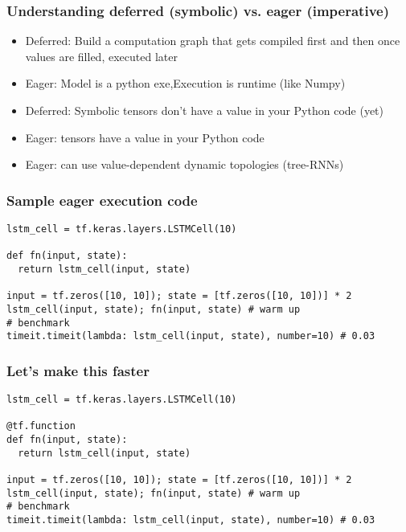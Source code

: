 
\begin{frame}[fragile] \frametitle{Understanding deferred (symbolic)
vs. eager (imperative)}

\begin{itemize}
\item  Deferred: Build a computation graph that gets compiled first and then once values are filled, executed later
\item  Eager: Model is a python exe,Execution is runtime (like Numpy)
\item Deferred: Symbolic tensors don’t have a value in your Python code (yet)
\item  Eager: tensors have a value in your Python code
\item Eager: can use value-dependent dynamic topologies 
(tree-RNNs)
\end{itemize}
\end{frame}


\begin{frame}[fragile] \frametitle{Sample eager execution code}

\begin{lstlisting}
lstm_cell = tf.keras.layers.LSTMCell(10)

def fn(input, state):
  return lstm_cell(input, state)
  
input = tf.zeros([10, 10]); state = [tf.zeros([10, 10])] * 2
lstm_cell(input, state); fn(input, state) # warm up
# benchmark
timeit.timeit(lambda: lstm_cell(input, state), number=10) # 0.03
\end{lstlisting}
\end{frame}

\begin{frame}[fragile] \frametitle{Let’s make this faster}

\begin{lstlisting}
lstm_cell = tf.keras.layers.LSTMCell(10)

@tf.function
def fn(input, state):
  return lstm_cell(input, state)
  
input = tf.zeros([10, 10]); state = [tf.zeros([10, 10])] * 2
lstm_cell(input, state); fn(input, state) # warm up
# benchmark
timeit.timeit(lambda: lstm_cell(input, state), number=10) # 0.03
\end{lstlisting}
\end{frame}


